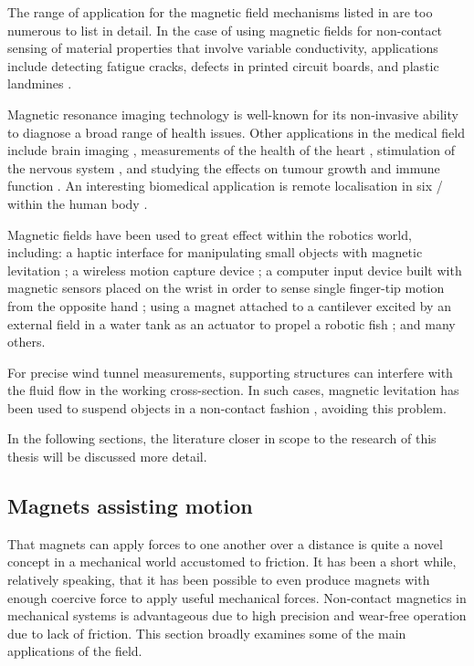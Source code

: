 \documentclass[11pt,a4paper]{memoir}
\begin{document}
The range of application for the magnetic field mechanisms listed in  are too numerous to list in detail.
In the case of using magnetic fields for non-contact sensing of material properties that involve variable conductivity, applications include detecting fatigue cracks, defects in printed circuit boards, and plastic landmines \cite{mukhopadhyay2005}.

Magnetic resonance imaging technology is well-known for its non-invasive ability to diagnose a broad range of health issues. Other applications in the medical field include brain imaging \cite{sekino2005,gjini2005,lu2008-ietm,demachi2008}, measurements of the health of the heart \cite{lim2009-ietm}, stimulation of the nervous system \cite{darabant2009}, and studying the effects on tumour growth and immune function \cite{yamaguchi2005-ietm}.
An interesting biomedical application is remote localisation in six \dofs/ within the human body \cite{yang2009-ietm}.

Magnetic fields have been used to great effect within the robotics world, including:
a haptic interface for manipulating small objects with magnetic levitation \cite{vanwest2007};
a wireless motion capture device \cite{hashi2005};
a computer input device built with magnetic sensors placed on the wrist in order to sense single finger-tip motion from the opposite hand \cite{han2008};
using a magnet attached to a cantilever excited by an external field in a water tank as an actuator to propel a robotic fish \cite{tomie2005};
and many others.

For precise wind tunnel measurements, supporting structures can interfere with the fluid flow in the working cross-section.
In such cases, magnetic levitation has been used to suspend objects in a non-contact fashion \cite{higuchi2008}, avoiding this problem.

In the following sections, the literature closer in scope to the research of this thesis will be discussed more detail.


\subsection{Magnets assisting motion}

That magnets can apply forces to one another over a distance is quite a novel concept in a mechanical world accustomed to friction.
It has been a short while, relatively speaking, that it has been possible to even produce magnets with enough coercive force to apply useful mechanical forces.
Non-contact magnetics in mechanical systems is advantageous due to high precision and wear-free operation due to lack of friction.
This section broadly examines some of the main applications of the field.
\end{document}
